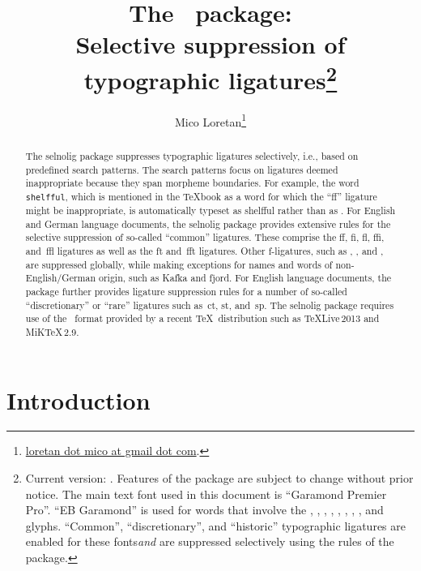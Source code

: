 \documentclass[11pt]{article}
\title{The \selnoligpackagename\ package: \\
Selective suppression of typographic ligatures\thanks{
Current version: \selnoligpackageversion. Features of the \pkg{selnolig} package are subject to change without prior notice. 
\newline\hspace*{\parindent}
The main text font used in this document is \enquote{Garamond Premier Pro}. \enquote{\ebg EB Garamond} is used for words that involve the {\ebg\uselig{fb}, \uselig{fh}, \uselig{fj}, \uselig{fk}, \uselig{ffb}, \uselig{ffh}, \uselig{ffj}, \uselig{ffk}, and \emph{\uselig{sk}}} glyphs. \enquote{Common}, \enquote{discretionary}, and \enquote{historic} typographic ligatures are enabled for these fonts\textemdash \emph{and} are suppressed selectively using the rules of the \pkg{selnolig} package.}}
\author{Mico Loretan\thanks{
\href{mailto:loretan.mico@gmail.com}{loretan dot mico at gmail dot com}.}}
\date{\selnoligpackagedate}
\newcommand{\pkg}[1]{\textsf{#1}}
\newcommand{\opt}[1]{\texttt{#1}}
\begin{document}
\VerbatimFootnotes
{}

\selnoligoff
\maketitle
\selnoligon


\begin{abstract}

The \pkg{selnolig} package suppresses typographic ligatures selectively, i.e., based on predefined search patterns. The search patterns focus on ligatures deemed inappropriate because they span morpheme boundaries. For example, the word \opt{shelfful}, which is mentioned in the \TeX book as a word for which the \enquote{ff} ligature might be inappropriate, is automatically typeset as shelfful rather than as .
\newline\hspace*{\parindent}
For English and German language documents, the \pkg{selnolig} package provides extensive rules for the selective suppression of so-called \enquote{common} ligatures. These comprise the ff, fi, fl, ffi, and~ffl ligatures as well as the ft and~fft ligatures. Other f-ligatures, such as {\ebg{}}, {\ebg{}}, {\ebg{}} and {\ebg{}}, are suppressed globally, while making exceptions for names and words of non-English/German origin, such as {\ebg Kafka} and {\ebg fjord}.
\newline\hspace*{\parindent}
For English language documents, the package further provides ligature suppression rules for a number of so-called \enquote{discretionary} or \enquote{rare} ligatures such as~ct, st, and~sp.
\newline\hspace*{\parindent}
The \pkg{selnolig} package requires use of the \LuaLaTeX\ format provided by a recent \TeX\ distribution such as \TeX Live\,2013 and MiK\TeX\,2.9.
\end{abstract}

\tableofcontents

\clearpage
{}

\section{Introduction}
\end{document}
